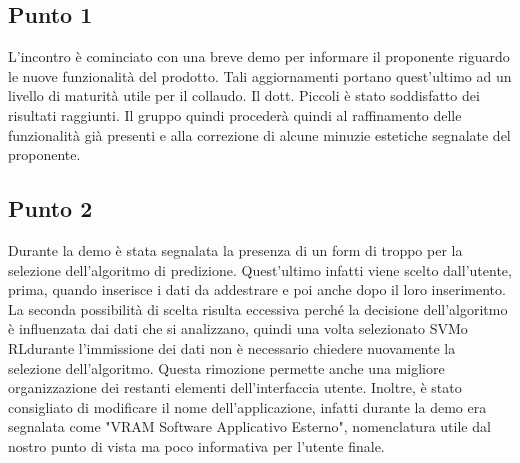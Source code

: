         \subsection{Punto 1}
            L'incontro è cominciato con una breve demo per informare il proponente riguardo le nuove funzionalità del prodotto\glo. Tali aggiornamenti portano quest'ultimo ad un livello di maturità utile per il collaudo. Il dott. Piccoli è stato soddisfatto dei risultati raggiunti. Il gruppo quindi procederà quindi al raffinamento delle funzionalità già presenti e alla correzione di alcune minuzie estetiche segnalate del proponente.
        \subsection{Punto 2}
            Durante la demo è stata segnalata la presenza di un form di troppo per la selezione dell'algoritmo di predizione. Quest'ultimo infatti viene scelto dall'utente, prima, quando inserisce i dati da addestrare e poi anche dopo il loro inserimento. La seconda possibilità di scelta risulta eccessiva perché la decisione dell'algoritmo è influenzata dai dati che si analizzano, quindi una volta selezionato SVM\glosp o RL\glosp durante l'immissione dei dati non è necessario chiedere nuovamente la selezione dell'algoritmo. Questa rimozione permette anche una migliore organizzazione dei restanti elementi dell'interfaccia utente. Inoltre, è stato consigliato di modificare il nome dell'applicazione, infatti durante la demo era segnalata come "VRAM Software Applicativo Esterno", nomenclatura utile dal nostro punto di vista ma poco informativa per l'utente finale.